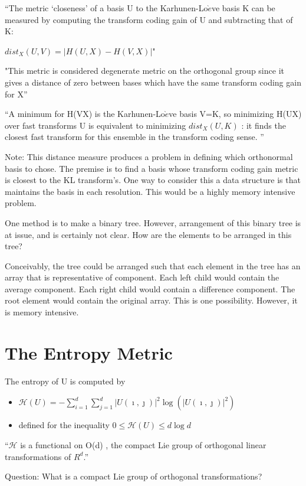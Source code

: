 \documentclass[11pt]{book}
\begin{document}
``The metric `closeness' of a basis U to the Karhunen-Lo$\grave{e}$ve basis K can be measured by computing the transform coding gain of U and subtracting that of K:

$dist_X (U,V)=|H(U,X)-H(V,X)|$"

"This metric is considered degenerate metric on the orthogonal group since it gives a distance of zero between bases which have the same transform coding gain for X''

``A minimum for H(VX) is the Karhunen-Lo$\grave{e}$ve basis V=K, so minimizing H(UX) over fast transforms U is equivalent to minimizing $dist_X(U,K)$ : it finds the closest fast transform for this ensemble in the transform coding sense.  ''

Note:  This distance measure produces a problem in defining which orthonormal basis to chose.  The premise is to find a basis whose transform coding gain metric is closest to the KL transform's.  One way to consider this a data structure is that maintains the basis in each resolution.  This would be a highly memory intensive problem. 

One method is to make a binary tree.  However, arrangement of this binary tree is at issue, and is certainly not clear.  How are the elements to be arranged in this tree?  

Conceivably, the tree could be arranged such that each element in the tree has an array that is representative of component.  Each left child would contain the average component.  Each right child would contain a difference component.  The root element would contain the original array.   This is one possibility.  However, it is memory intensive.  

\section{The Entropy Metric }
The entropy of U is computed by
\begin{itemize}
\item $\mathcal{H}(U) = - \sum\limits^d_{i=1} \sum\limits^{d}_{j=1} |U(\imath , \jmath)|^2 \log (|U(\imath , \jmath)|^2) $
\item defined for the inequality  $0\le \mathcal{H}(U) \le d\log d$
\end{itemize}



``$\mathcal{H}$ is a functional on O(d) , the compact Lie group of orthogonal linear transformations of $R^d$.''

Question:  What is a compact Lie group of orthogonal transformations?
\end{document}
